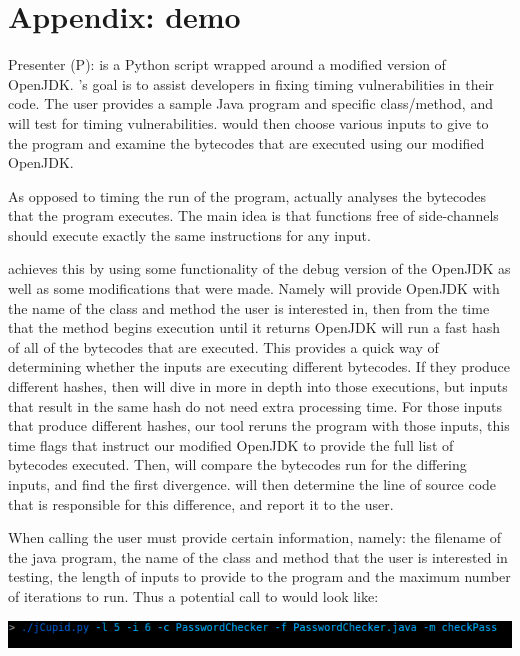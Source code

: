 
\section{Appendix: \jcupid demo}

Presenter (P): \jcupid is a Python script wrapped around a modified version of OpenJDK. \jcupid's goal
is to assist developers in fixing timing vulnerabilities in their code. The user provides a sample
Java program and specific class/method, and \jcupid will test for timing vulnerabilities. \jcupid would then choose various
inputs to give to the program and examine the bytecodes that are executed using our modified OpenJDK.

As opposed to timing the run of the program, \jcupid actually analyses the bytecodes that the program
executes. The main idea is that functions free of side-channels should execute exactly the same instructions for any input.

\jcupid achieves this by using some functionality of the debug version of the OpenJDK as well as some
modifications that were made. Namely \jcupid will provide OpenJDK with the name of the class and method
the user is interested in, then from the time that the method begins execution until it returns OpenJDK
will run a fast hash of all of the bytecodes that are executed. This provides a quick way of determining
whether the inputs are executing different bytecodes. If they produce different hashes, then \jcupid will dive 
in more in depth into those executions, but inputs that result in the same hash do not need extra processing time.
For those inputs that produce different hashes, our tool reruns the program with those inputs, this time
flags that instruct our modified OpenJDK to provide the full list of bytecodes
executed. Then, \jcupid will compare the bytecodes run for the differing inputs, and find the first divergence.
\jcupid will then determine the line of source code that is responsible for this difference, and report it to the user.

When calling \jcupid the user must provide certain information, namely: the filename of the java program,
the name of the class and method that the user is interested in testing, the length of inputs to provide
to the program and the maximum number of iterations to run. Thus a potential call to \jcupid would look like:

\begin{center}
  \includegraphics[width=\linewidth]{jCupidCall}
\end{center}

